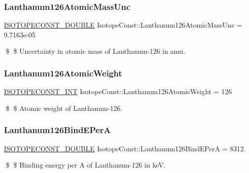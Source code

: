 \subsubsection{\texorpdfstring{Lanthanum126\+Atomic\+Mass\+Unc}{Lanthanum126AtomicMassUnc}}
{\footnotesize\ttfamily \mbox{\hyperlink{group___isotope_const-_macros_ga8f45a7272ce02c0b4c65c44636ed719a}{I\+S\+O\+T\+O\+P\+E\+C\+O\+N\+S\+T\+\_\+\+D\+O\+U\+B\+LE}} Isotope\+Const\+::\+Lanthanum126\+Atomic\+Mass\+Unc = 9.\+7163e-\/05}

\$ \$ Uncertainty in atomic mass of Lanthanum-\/126 in amu. \mbox{\label{group___isotope_const-_lanthanum-_la126_gad8aa7611e693e342b78f53cb491adf88}} 
\subsubsection{\texorpdfstring{Lanthanum126\+Atomic\+Weight}{Lanthanum126AtomicWeight}}
{\footnotesize\ttfamily \mbox{\hyperlink{group___isotope_const-_macros_ga5f18360b3e99483a35c32d789e62621c}{I\+S\+O\+T\+O\+P\+E\+C\+O\+N\+S\+T\+\_\+\+I\+NT}} Isotope\+Const\+::\+Lanthanum126\+Atomic\+Weight = 126}

\$ \$ Atomic weight of Lanthanum-\/126. \mbox{\label{group___isotope_const-_lanthanum-_la126_ga423ba4c3d909be20e81f478ebb4f0ecc}} 
\subsubsection{\texorpdfstring{Lanthanum126\+Bind\+E\+PerA}{Lanthanum126BindEPerA}}
{\footnotesize\ttfamily \mbox{\hyperlink{group___isotope_const-_macros_ga8f45a7272ce02c0b4c65c44636ed719a}{I\+S\+O\+T\+O\+P\+E\+C\+O\+N\+S\+T\+\_\+\+D\+O\+U\+B\+LE}} Isotope\+Const\+::\+Lanthanum126\+Bind\+E\+PerA = 8312.}

\$ \$ Binding energy per A of Lanthanum-\/126 in keV. \mbox{\label{group___isotope_const-_lanthanum-_la126_ga898b429cfd95189bdcbc55853f1269b3}} 
